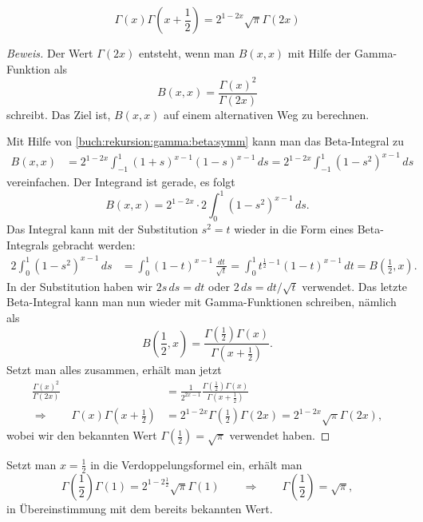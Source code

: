 \begin{satz}[Legendre]
\[
\Gamma(x)\Gamma(x+{\textstyle\frac12})
=
2^{1-2x}\sqrt{\pi}
\Gamma(2x)
\]
\end{satz}

\begin{proof}[Beweis]
Der Wert $\Gamma(2x)$ entsteht, wenn man $B(x,x)$ mit Hilfe der
Gamma-Funktion als
\[
B(x,x)
=
\frac{\Gamma(x)^2}{\Gamma(2x)}
\]
schreibt.
Das Ziel ist, $B(x,x)$ auf einem alternativen Weg zu berechnen.

Mit Hilfe von \eqref{buch:rekursion:gamma:beta:symm}
kann man das Beta-Integral zu
\begin{align*}
B(x,x)
&=
2^{1-2x}
\int_{-1}^1
(1+s)^{x-1}(1-s)^{x-1}
\,ds
=
2^{1-2x}
\int_{-1}^1(1-s^2)^{x-1}\,ds
\end{align*}
vereinfachen.
Der Integrand ist gerade, es folgt
\[
B(x,x)
=
2^{1-2x}
\cdot 2
\int_0^1(1-s^2)^{x-1}\,ds.
\]
Das Integral kann mit der Substitution $s^2=t$ wieder in die Form
eines Beta-Integrals gebracht werden:
\begin{align*}
2\int_0^1(1-s^2)^{x-1}\,ds
&=
\int_0^1 (1-t)^{x-1} \,\frac{dt}{\sqrt{t}}
=
\int_0^1 t^{\frac12-1}(1-t)^{x-1}\,dt
=
B({\textstyle\frac12},x).
\end{align*}
In der Substitution haben wir $2s\,ds = dt$ oder $2\,ds = dt/\sqrt{t}$
verwendet.
Das letzte Beta-Integral kann man nun wieder mit Gamma-Funktionen
schreiben, nämlich als
\[
B({\textstyle\frac12},x)
=
\frac{\Gamma({\textstyle\frac12})\Gamma(x)}{\Gamma(x+{\textstyle\frac12})}.
\]
Setzt man alles zusammen, erhält man jetzt
\begin{align*}
\frac{\Gamma(x)^2}{\Gamma(2x)}
&=
\frac1{2^{2x-1}}
\frac{\Gamma({\textstyle\frac12})\Gamma(x)}{\Gamma(x+{\textstyle\frac12})}
\\
\Rightarrow\qquad
\Gamma(x)\Gamma(x+{\textstyle\frac12})
&=
2^{1-2x}
\Gamma({\textstyle\frac12})\Gamma(2x)
=
2^{1-2x}\sqrt{\pi}\Gamma(2x),
\end{align*}
wobei wir den bekannten Wert $\Gamma(\frac12)=\sqrt{\pi}$ verwendet haben.
\end{proof}

Setzt man $x=\frac12$ in die Verdoppelungsformel ein, erhält man
\[
\Gamma({\textstyle\frac12})\Gamma(1) = 2^{1-2\frac12}\sqrt{\pi}\Gamma(1)
\qquad\Rightarrow\qquad
\Gamma({\textstyle\frac12}) = \sqrt{\pi},
\]
in Übereinstimmung mit dem bereits bekannten Wert.

